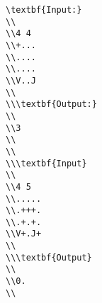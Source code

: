 \begin{verbatim}
\textbf{Input:}
\\
\\4 4
\\+...
\\....
\\....
\\V..J
\\
\\\textbf{Output:}
\\
\\3
\\
\\
\\\textbf{Input}
\\
\\4 5
\\.....
\\.+++.
\\.+.+.
\\V+.J+
\\
\\\textbf{Output}
\\
\\0.
\\\end{verbatim}
